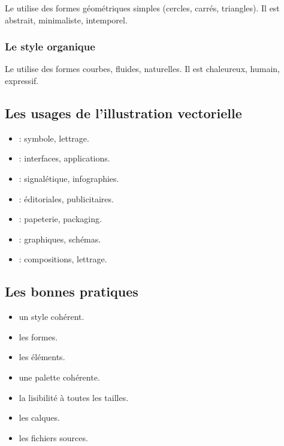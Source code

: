 Le  utilise des formes géométriques simples (cercles, carrés, triangles). Il est abstrait, minimaliste, intemporel.

\subsubsection{Le style organique}

Le  utilise des formes courbes, fluides, naturelles. Il est chaleureux, humain, expressif.

\subsection{Les usages de l'illustration vectorielle}

\begin{itemize}
    \item {} : symbole, lettrage.
    \item {} : interfaces, applications.
    \item {} : signalétique, infographies.
    \item {} : éditoriales, publicitaires.
    \item {} : papeterie, packaging.
    \item {} : graphiques, schémas.
    \item {} : compositions, lettrage.
\end{itemize}

\subsection{Les bonnes pratiques}

\begin{itemize}
    \item {} un style cohérent.
    \item {} les formes.
    \item {} les éléments.
    \item {} une palette cohérente.
    \item {} la lisibilité à toutes les tailles.
    \item {} les calques.
    \item {} les fichiers sources.
\end{itemize}

